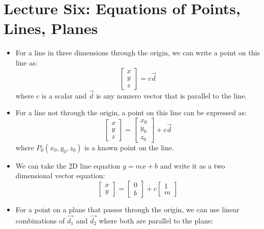 \section{Lecture Six: Equations of Points, Lines, Planes}
\begin{itemize}
    \item For a line in three dimensions through the origin, we can write a point on this line as:
    \begin{equation}
        \begin{bmatrix}
            x\\y\\z
        \end{bmatrix} = c\vec{d}
        \label{eq:}
    \end{equation}
    where $c$ is a scalar and $\vec{d}$ is any nonzero vector that is parallel to the line.
    \item For a line not through the origin, a point on this line can be expressed as:
    \begin{equation}
        \begin{bmatrix}
            x\\y\\z
        \end{bmatrix} = \begin{bmatrix}
            x_0\\y_0\\z_0
        \end{bmatrix} + c\vec{d}
        \label{eq:}
    \end{equation}
    where $P_0(x_0,y_0,z_0)$ is a known point on the line. 
    \item We can take the 2D line equation $y=mx+b$ and write it as a two dimensional  vector equation:
    \begin{equation}
        \begin{bmatrix}
            x \\ y
        \end{bmatrix}
        =
        \begin{bmatrix}
            0 \\ b
        \end{bmatrix}
        +
        c\begin{bmatrix}
            1 \\ m
        \end{bmatrix}
        \label{eq:}
    \end{equation}
    \item For a point on a plane that passes through the origin, we can use linear combinations of $\vec{d_1}$ and $\vec{d_2}$ where both are parallel to the plane:

\end{itemize}
